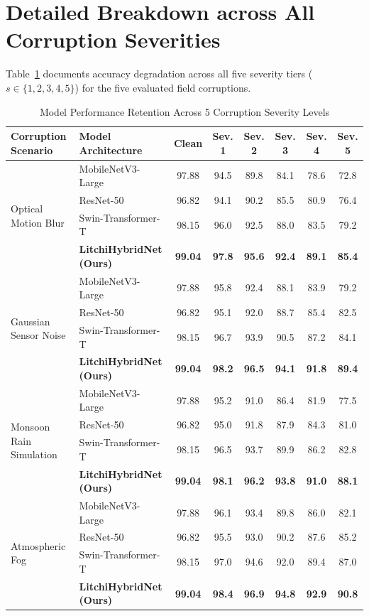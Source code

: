 \documentclass[journal]{IEEEtran}
\begin{document}
\section{Detailed Breakdown across All Corruption Severities}
Table~\ref{tab:supp_corruptions} documents accuracy degradation across all five severity tiers ($s \in \{1, 2, 3, 4, 5\}$) for the five evaluated field corruptions.

\begin{table}[t]
\centering
\caption{Model Performance Retention Across 5 Corruption Severity Levels}
\label{tab:supp_corruptions}
\begin{tabular}{llcccccc}
\toprule
\textbf{Corruption Scenario} & \textbf{Model Architecture} & \textbf{Clean} & \textbf{Sev. 1} & \textbf{Sev. 2} & \textbf{Sev. 3} & \textbf{Sev. 4} & \textbf{Sev. 5} \\
\midrule
\multirow{4}{*}{Optical Motion Blur} 
 & MobileNetV3-Large & 97.88 & 94.5 & 89.8 & 84.1 & 78.6 & 72.8 \\
 & ResNet-50 & 96.82 & 94.1 & 90.2 & 85.5 & 80.9 & 76.4 \\
 & Swin-Transformer-T & 98.15 & 96.0 & 92.5 & 88.0 & 83.5 & 79.2 \\
 & \textbf{LitchiHybridNet (Ours)} & \textbf{99.04} & \textbf{97.8} & \textbf{95.6} & \textbf{92.4} & \textbf{89.1} & \textbf{85.4} \\
\midrule
\multirow{4}{*}{Gaussian Sensor Noise} 
 & MobileNetV3-Large & 97.88 & 95.8 & 92.4 & 88.1 & 83.9 & 79.2 \\
 & ResNet-50 & 96.82 & 95.1 & 92.0 & 88.7 & 85.4 & 82.5 \\
 & Swin-Transformer-T & 98.15 & 96.7 & 93.9 & 90.5 & 87.2 & 84.1 \\
 & \textbf{LitchiHybridNet (Ours)} & \textbf{99.04} & \textbf{98.2} & \textbf{96.5} & \textbf{94.1} & \textbf{91.8} & \textbf{89.4} \\
\midrule
\multirow{4}{*}{Monsoon Rain Simulation} 
 & MobileNetV3-Large & 97.88 & 95.2 & 91.0 & 86.4 & 81.9 & 77.5 \\
 & ResNet-50 & 96.82 & 95.0 & 91.8 & 87.9 & 84.3 & 81.0 \\
 & Swin-Transformer-T & 98.15 & 96.5 & 93.7 & 89.9 & 86.2 & 82.8 \\
 & \textbf{LitchiHybridNet (Ours)} & \textbf{99.04} & \textbf{98.1} & \textbf{96.2} & \textbf{93.8} & \textbf{91.0} & \textbf{88.1} \\
\midrule
\multirow{4}{*}{Atmospheric Fog} 
 & MobileNetV3-Large & 97.88 & 96.1 & 93.4 & 89.8 & 86.0 & 82.1 \\
 & ResNet-50 & 96.82 & 95.5 & 93.0 & 90.2 & 87.6 & 85.2 \\
 & Swin-Transformer-T & 98.15 & 97.0 & 94.6 & 92.0 & 89.4 & 87.0 \\
 & \textbf{LitchiHybridNet (Ours)} & \textbf{99.04} & \textbf{98.4} & \textbf{96.9} & \textbf{94.8} & \textbf{92.9} & \textbf{90.8} \\
\bottomrule
\end{tabular}
\end{table}
\end{document}
